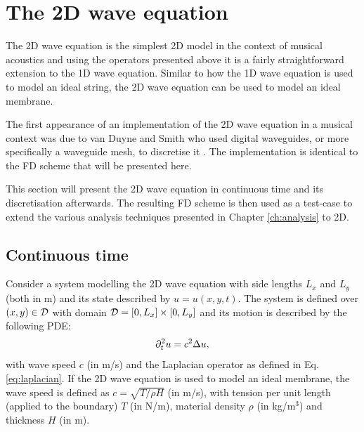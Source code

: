\section{The 2D wave equation}\label{sec:2Dwave}
The 2D wave equation is the simplest 2D model in the context of musical acoustics and using the operators presented above it is a fairly straightforward extension to the 1D wave equation. Similar to how the 1D wave equation is used to model an ideal string, the 2D wave equation can be used to model an ideal membrane. 

The first appearance of an implementation of the 2D wave equation in a musical context was due to van Duyne and Smith who used digital waveguides, or more specifically a waveguide mesh, to discretise it \cite{Duyne1993}. The implementation is identical to the FD scheme that will be presented here.

This section will present the 2D wave equation in continuous time and its discretisation afterwards. The resulting FD scheme is then used as a test-case to extend the various analysis techniques presented in Chapter \ref{ch:analysis} to 2D.

\subsection{Continuous time}
Consider a system modelling the 2D wave equation with side lengths $L_x$ and $L_y$ (both in m) and its state described by $u = u(x,y,t)$. The system is defined over $(x,y) \in \mathcal{D}$ with domain $\mathcal{D} = [0, L_x] \times[0, L_y]$ and its motion is described by the following PDE:
\begin{equation}\label{eq:2DwavePDE}
    \partial_t^2 u = c^2\Delta u,
\end{equation}
with wave speed $c$ (in m/s) and the Laplacian operator as defined in Eq. \eqref{eq:laplacian}. If the 2D wave equation is used to model an ideal membrane, the wave speed is defined as $c = \sqrt{T/\rho H}$ (in m/s), with tension per unit length (applied to the boundary)  $T$ (in N/m), material density $\rho$ (in kg/m$^3$) and thickness $H$ (in m).

